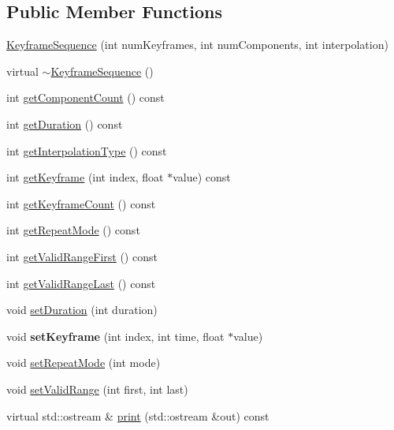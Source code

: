 \subsection*{Public Member Functions}
\begin{CompactItemize}
\item 
\hyperlink{classm3g_1_1KeyframeSequence_0c07c479375c11ff94cff02c1267f0d0}{KeyframeSequence} (int numKeyframes, int numComponents, int interpolation)
\item 
virtual \hyperlink{classm3g_1_1KeyframeSequence_464f5929e3302c788ca626c11ca8d656}{$\sim$KeyframeSequence} ()
\item 
int \hyperlink{classm3g_1_1KeyframeSequence_7016f51d2788e78fdd736efd040f5e5e}{getComponentCount} () const 
\item 
int \hyperlink{classm3g_1_1KeyframeSequence_995a5ca5c8c3c993ef167f67cbb5fabe}{getDuration} () const 
\item 
int \hyperlink{classm3g_1_1KeyframeSequence_0d46321e7f46e037508cce88cdf6a487}{getInterpolationType} () const 
\item 
int \hyperlink{classm3g_1_1KeyframeSequence_0fd27047149eedab8b10319768e1fe9a}{getKeyframe} (int index, float $\ast$value) const 
\item 
int \hyperlink{classm3g_1_1KeyframeSequence_4d500a603f25adafd8e6f8b68872dbff}{getKeyframeCount} () const 
\item 
int \hyperlink{classm3g_1_1KeyframeSequence_a356af60b9759d5d3da833773e3c7b73}{getRepeatMode} () const 
\item 
int \hyperlink{classm3g_1_1KeyframeSequence_b7e54386674cefdb8f5fa65ce5435b50}{getValidRangeFirst} () const 
\item 
int \hyperlink{classm3g_1_1KeyframeSequence_aa98cc8d698c482c33a3487c33db27d0}{getValidRangeLast} () const 
\item 
void \hyperlink{classm3g_1_1KeyframeSequence_d7406d5e0e2f398e05e3563d099dfdf1}{setDuration} (int duration)
\item 
\hypertarget{classm3g_1_1KeyframeSequence_700d02a4ac28514016721e4b1d2bcf96}{
void \textbf{setKeyframe} (int index, int time, float $\ast$value)}
\label{classm3g_1_1KeyframeSequence_700d02a4ac28514016721e4b1d2bcf96}

\item 
void \hyperlink{classm3g_1_1KeyframeSequence_e5cd1486fe0a8a61cf96816e976d7f87}{setRepeatMode} (int mode)
\item 
void \hyperlink{classm3g_1_1KeyframeSequence_b5a824131cef547816366141afe0339a}{setValidRange} (int first, int last)
\item 
virtual std::ostream \& \hyperlink{classm3g_1_1KeyframeSequence_6fea17fa1532df3794f8cb39cb4f911f}{print} (std::ostream \&out) const 
\end{CompactItemize}
